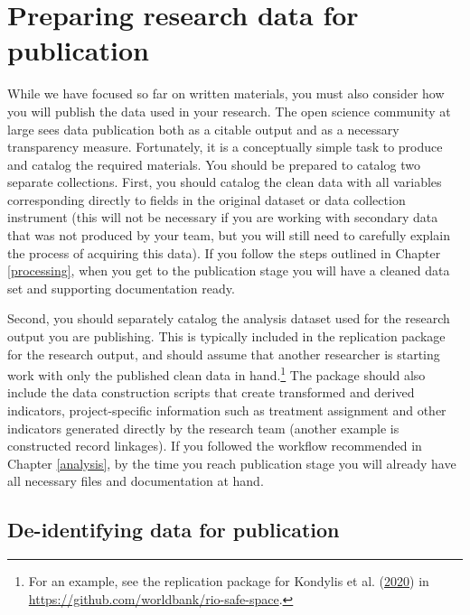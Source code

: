 \documentclass[
]{book}
\begin{document}
\hypertarget{preparing-research-data-for-publication}{%
\section*{Preparing research data for publication}\label{preparing-research-data-for-publication}}

While we have focused so far on written materials,
you must also consider how you will publish
the data used in your research.
The open science community at large sees data publication
both as a citable output and as a necessary transparency measure.
Fortunately, it is a conceptually simple task to produce
and catalog the required materials.
You should be prepared to catalog two separate collections.
First, you should catalog the clean data
with all variables corresponding directly
to fields in the original dataset or data collection instrument
(this will not be necessary if you are working with secondary data
that was not produced by your team,
but you will still need to carefully explain the process of acquiring this data).
If you follow the steps outlined in Chapter \ref{processing},
when you get to the publication stage you will have
a cleaned data set and supporting documentation ready.

Second, you should separately catalog
the analysis dataset used for the research output you are publishing.
This is typically included in the replication package for the research output,
and should assume that another researcher is starting work
with only the published clean data in hand.\footnote{For an example, see the replication package for Kondylis et al. (\protect\hyperlink{ref-kondylis2020demand}{2020})
  in \url{https://github.com/worldbank/rio-safe-space}.}
The package should also include the data construction scripts
that create transformed and derived indicators,
project-specific information
such as treatment assignment and other indicators
generated directly by the research team (another example is constructed record linkages).
If you followed the workflow recommended in Chapter \ref{analysis},
by the time you reach publication stage you will already have all necessary
files and documentation at hand.

\hypertarget{de-identifying-data-for-publication}{%
\subsection*{De-identifying data for publication}\label{de-identifying-data-for-publication}}
\end{document}
